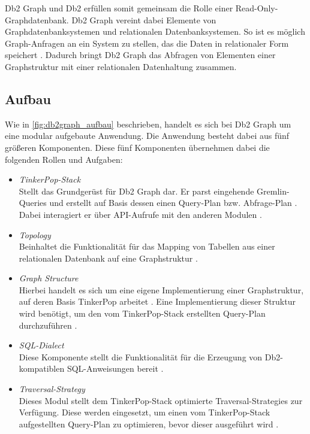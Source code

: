 Db2 Graph und Db2 erfüllen somit gemeinsam die Rolle einer Read-Only-Graph\-daten\-bank. Db2 Graph vereint dabei Elemente von Graphdatenbanksystemen und relationalen Datenbanksystemen. So ist es möglich Graph-Anfragen an ein System zu stellen, das die Daten in relationaler Form speichert \cite{vldb_tian, sigmod_tian}. Dadurch bringt Db2 Graph das Abfragen von Elementen einer Graphstruktur mit einer relationalen Datenhaltung zusammen. 

\subsection{Aufbau}
Wie in \autoref{fig:db2graph_aufbau} beschrieben, handelt es sich bei Db2 Graph um eine modular aufgebaute Anwendung. Die Anwendung besteht dabei aus fünf größeren Komponenten. Diese fünf Komponenten übernehmen dabei die folgenden Rollen und Aufgaben: 

\begin{itemize}
    \item \textit{TinkerPop-Stack}\\Stellt das Grundgerüst für Db2 Graph dar. Er parst eingehende Gremlin-Queries und erstellt auf Basis dessen einen Query-Plan bzw. Abfrage-Plan \cite{vldb_tian}. Dabei interagiert er über API-Aufrufe mit den anderen Modulen \cite{vldb_tian}.
    \item \textit{Topology}\\Beinhaltet die Funktionalität für das Mapping von Tabellen aus einer relationalen Datenbank auf eine Graphstruktur \cite{vldb_tian, sigmod_tian}.
    \item \textit{Graph Structure}\\Hierbei handelt es sich um eine eigene Implementierung einer Graphstruktur, auf deren Basis TinkerPop arbeitet \cite{vldb_tian}. Eine Implementierung dieser Struktur wird benötigt, um den vom TinkerPop-Stack erstellten Query-Plan durchzuführen \cite{sigmod_tian}. 
    \item \textit{SQL-Dialect}\\Diese Komponente stellt die Funktionalität für die Erzeugung von Db2-kompatiblen SQL-Anweisungen bereit \cite{sigmod_tian}.
    \item \textit{Traversal-Strategy}\\Dieses Modul stellt dem TinkerPop-Stack optimierte Traversal-Strategies zur Verfügung. Diese werden eingesetzt, um einen vom TinkerPop-Stack aufgestellten Query-Plan zu optimieren, bevor dieser ausgeführt wird \cite{sigmod_tian}.  
\end{itemize}

